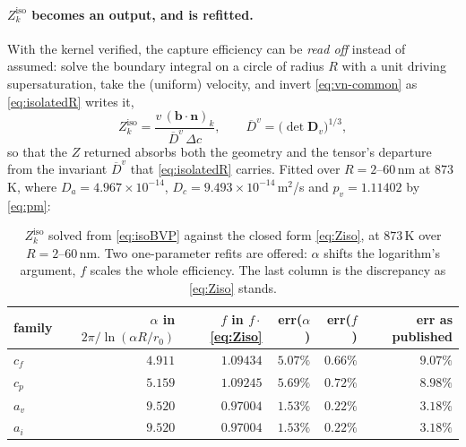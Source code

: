 \documentclass{article}
\newcommand{\bvec}{\bm b}
\newcommand{\nvec}{\bm n}
\newcommand{\Dten}{\bm D}
\begin{document}
\paragraph{$Z^{\mathrm{iso}}_k$ becomes an output, and is refitted.} With the
kernel verified, the capture efficiency can be \emph{read off} instead of
assumed: solve the boundary integral on a circle of radius $R$ with a unit
driving supersaturation, take the (uniform) velocity, and invert
\cref{eq:vn-common} as \cref{eq:isolatedR} writes it,
\begin{equation}
  Z^{\mathrm{iso}}_k
   =\frac{v\,(\bvec\!\cdot\!\nvec)_k}{\overline D^{v}\,\Delta c},
  \qquad
  \overline D^{v}=\bigl(\det\Dten_v\bigr)^{1/3},
  \label{eq:Zread}
\end{equation}
so that the $Z$ returned absorbs both the geometry and the tensor's departure
from the invariant $\overline D^{v}$ that \cref{eq:isolatedR} carries. Fitted over
$R=2$--$60\,$nm at $873\,$K, where $D_a=4.967\times10^{-14}$,
$D_c=9.493\times10^{-14}\,$m$^2$/s and $p_v=1.11402$ by \cref{eq:pm}:

\begin{table}[htbp]
\centering
\caption{$Z^{\mathrm{iso}}_k$ solved from \cref{eq:isoBVP} against the closed form
\cref{eq:Ziso}, at $873\,$K over $R=2$--$60\,$nm. Two one-parameter refits are
offered: $\alpha$ shifts the logarithm's argument, $f$ scales the whole
efficiency. The last column is the discrepancy as \cref{eq:Ziso} stands.}
\label{tab:Ziso-refit}
\begin{tabular}{@{}l r r r r r@{}}
\toprule
family & $\alpha$ in $2\pi/\ln(\alpha R/r_0)$ & $f$ in $f\cdot$\cref{eq:Ziso}
 & err($\alpha$) & err($f$) & err as published\\
\midrule
$c_f$ & $4.911$ & $\mathbf{1.09434}$ & $5.07\%$ & $\mathbf{0.66\%}$ & $9.07\%$\\
$c_p$ & $5.159$ & $\mathbf{1.09245}$ & $5.69\%$ & $\mathbf{0.72\%}$ & $8.98\%$\\
$a_v$ & $9.520$ & $\mathbf{0.97004}$ & $1.53\%$ & $\mathbf{0.22\%}$ & $3.18\%$\\
$a_i$ & $9.520$ & $\mathbf{0.97004}$ & $1.53\%$ & $\mathbf{0.22\%}$ & $3.18\%$\\
\bottomrule
\end{tabular}
\end{table}
\end{document}

